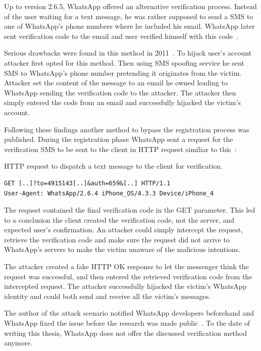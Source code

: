 \documentclass[thesis=M,english]{FITthesis}[2012/10/20]
\begin{document}
Up to version 2.6.5, WhatsApp offered an alternative verification process. Instead of the user waiting for a text message, he was rather supposed to send a SMS to one of WhatsApp's phone numbers where he included his email. WhatsApp later sent verification code to the email and user verified himself with this code~\cite{whatsapp-shootingthemsg}.

Serious drawbacks were found in this method in 2011~\cite{whatsapp-hijack1}. To hijack user's account attacker first opted for this method. Then using SMS spoofing service he sent SMS to WhatsApp's phone number pretending it originates from the victim. Attacker set the content of the message to an email he owned leading to WhatsApp sending the verification code to the attacker. The attacker then simply entered the code from an email and successfully hijacked the victim's account.

Following these findings another method to bypass the registration process was published. During the registration phase WhatsApp sent a request for the verification SMS to be sent to the client in HTTP request similiar to this~\cite{whatsapp-shootingthemsg}:

\begin{listing}[htb]
\caption{HTTP request to dispatch a text message to the client for verification.}
\begin{verbatim}
GET [..]?to=4915143[..]&auth=659&[..] HTTP/1.1
User-Agent: WhatsApp/2.6.4 iPhone_OS/4.3.3 Device/iPhone_4
\end{verbatim}
\label{lst:status-whatsapp-http}
\end{listing}

The request contained the final verification code in the GET parameter. This led to a conclusion the client created the verification code, not the server, and expected user's confirmation. An attacker could simply intercept the request, retrieve the verification code and make sure the request did not arrive to WhatsApp's servers to make the victim unaware of the malicious intentions.

The attacker created a fake HTTP OK response to let the messenger think the request was successful, and then entered the retrieved verification code from the intercepted request. The attacker successfully hijacked the victim's WhatsApp identity and could both send and receive all the victim's messages.

The author of the attack scenario notified WhatsApp developers beforehand and WhatsApp fixed the issue before the research was made public~\cite{whatsapp-shootingthemsg}. To the date of writing this thesis, WhatsApp does not offer the discussed verification method anymore.
\end{document}
